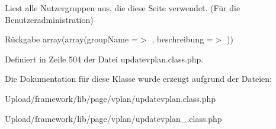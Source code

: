 Liest alle Nutzergruppen aus, die diese Seite verwendet. (Für die Benutzeradministration) \begin{DoxyReturn}{Rückgabe}
array(array(\textquotesingle{}group\+Name\textquotesingle{} =$>$ \textquotesingle{}\textquotesingle{}, \textquotesingle{}beschreibung\textquotesingle{} =$>$ \textquotesingle{}\textquotesingle{})) 
\end{DoxyReturn}


Definiert in Zeile 504 der Datei updatevplan.\+class.\+php.



Die Dokumentation für diese Klasse wurde erzeugt aufgrund der Dateien\+:\begin{DoxyCompactItemize}
\item 
Upload/framework/lib/page/vplan/updatevplan.\+class.\+php\item 
Upload/framework/lib/page/vplan/updatevplan\+\_\+.\+class.\+php\end{DoxyCompactItemize}
